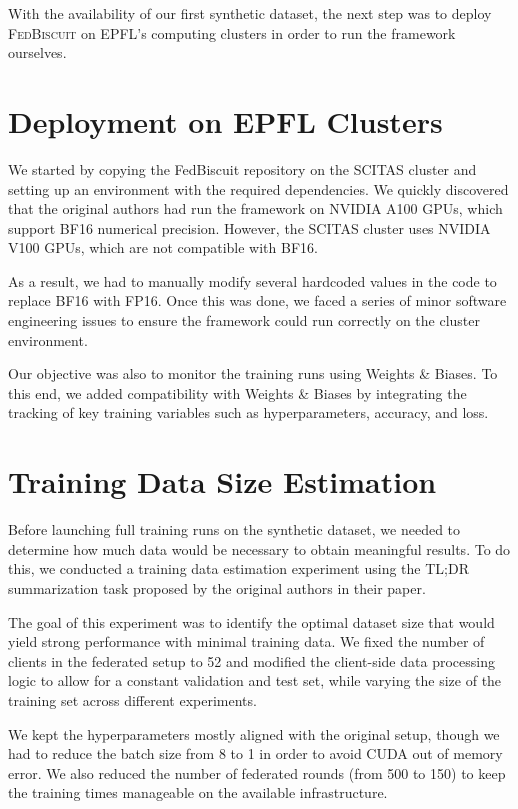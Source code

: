 With the availability of our first synthetic dataset, the next step was to deploy \textsc{FedBiscuit} on EPFL's computing clusters in order to run the framework ourselves.

\section{Deployment on EPFL Clusters}

We started by copying the FedBiscuit repository on the SCITAS cluster and setting up an environment with the required dependencies. We quickly discovered that the original authors had run the framework on NVIDIA A100 GPUs, which support BF16 numerical precision. However, the SCITAS cluster uses NVIDIA V100 GPUs, which are not compatible with BF16.

As a result, we had to manually modify several hardcoded values in the code to replace BF16 with FP16. Once this was done, we faced a series of minor software engineering issues to ensure the framework could run correctly on the cluster environment.

Our objective was also to monitor the training runs using Weights \& Biases. To this end, we added compatibility with Weights \& Biases by integrating the tracking of key training variables such as hyperparameters, accuracy, and loss.

\section{Training Data Size Estimation}

Before launching full training runs on the synthetic dataset, we needed to determine how much data would be necessary to obtain meaningful results. To do this, we conducted a training data estimation experiment using the TL;DR summarization task proposed by the original authors in their paper.

The goal of this experiment was to identify the optimal dataset size that would yield strong performance with minimal training data. We fixed the number of clients in the federated setup to 52 and modified the client-side data processing logic to allow for a constant validation and test set, while varying the size of the training set across different experiments.

We kept the hyperparameters mostly aligned with the original setup, though we had to reduce the batch size from 8 to 1 in order to avoid CUDA out of memory error. We also reduced the number of federated rounds (from 500 to 150) to keep the training times manageable on the available infrastructure.

